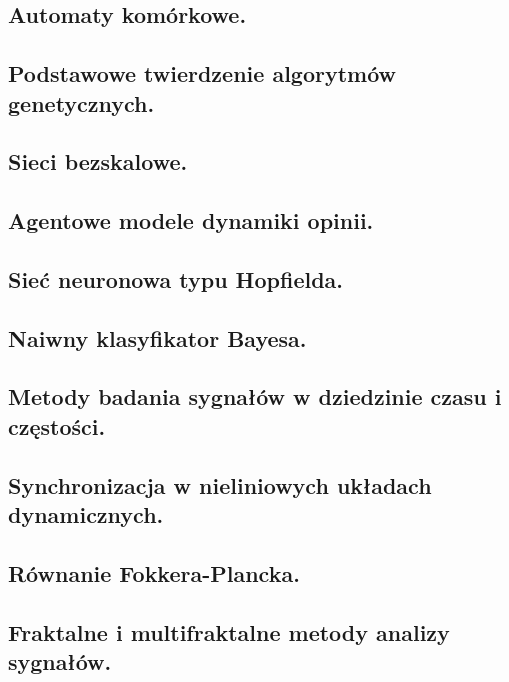 \documentclass[10pt,a4paper]{article} %
\begin{document}
    \subsection{Automaty komórkowe.}
    
    
    \subsection{Podstawowe twierdzenie algorytmów genetycznych.}
    
    
    \subsection{Sieci bezskalowe.}
    
	
	\subsection{Agentowe modele dynamiki opinii.}
	
	
	\subsection{Sieć neuronowa typu Hopfielda.}
	
	
	\subsection{Naiwny klasyfikator Bayesa.}
	
	
	\subsection{Metody badania sygnałów w dziedzinie czasu i częstości.}
	
	
	\subsection{Synchronizacja w nieliniowych układach dynamicznych.}
	
	
	\subsection{Równanie Fokkera-Plancka.}
	
	
	\subsection{Fraktalne i multifraktalne metody analizy sygnałów.}
	
	
\end{document}
